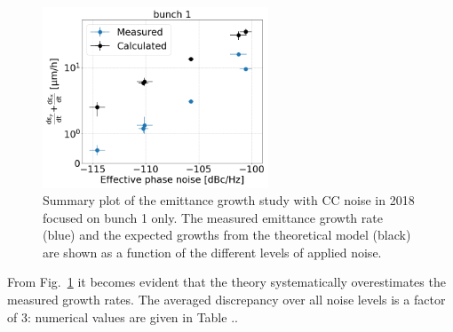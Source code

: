\begin{figure}[!h]
   \centering         
   \includegraphics[width=0.6\textwidth]{images/Ch5/MD5_summary_bunch1_backg_subtracted_vs_theory.png}
       \caption{Summary plot of the emittance growth study with CC noise in 2018 focused on bunch 1 only. The measured emittance growth rate (blue) and the expected growths from the theoretical model (black) are shown as a function of the different levels of applied noise.}
       \label{fig:MD5_bunch1_theory_vs_meas}
\end{figure}


From Fig.~\ref{fig:MD5_bunch1_theory_vs_meas} it becomes evident that the theory systematically overestimates the measured growth rates. The averaged discrepancy over all noise levels is a factor of 3: numerical values are given in Table ..

